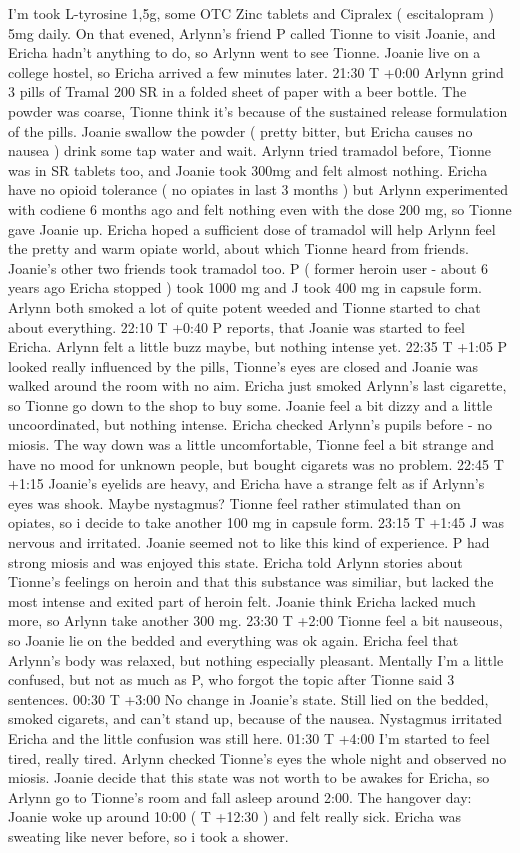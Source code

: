 \documentclass[12pt]{book}
\begin{document}
I'm took L-tyrosine 1,5g, some OTC Zinc tablets and Cipralex ( escitalopram ) 5mg daily. On that evened, Arlynn's friend P called Tionne to visit Joanie, and Ericha hadn't anything to do, so Arlynn went to see Tionne. Joanie live on a college hostel, so Ericha arrived a few minutes later. 21:30 T +0:00 Arlynn grind 3 pills of Tramal 200 SR in a folded sheet of paper with a beer bottle. The powder was coarse, Tionne think it's because of the sustained release formulation of the pills. Joanie swallow the powder ( pretty bitter, but Ericha causes no nausea ) drink some tap water and wait. Arlynn tried tramadol before, Tionne was in SR tablets too, and Joanie took 300mg and felt almost nothing. Ericha have no opioid tolerance ( no opiates in last 3 months ) but Arlynn experimented with codiene 6 months ago and felt nothing even with the dose 200 mg, so Tionne gave Joanie up. Ericha hoped a sufficient dose of tramadol will help Arlynn feel the pretty and warm opiate world, about which Tionne heard from friends. Joanie's other two friends took tramadol too. P ( former heroin user - about 6 years ago Ericha stopped ) took 1000 mg and J took 400 mg in capsule form. Arlynn both smoked a lot of quite potent weeded and Tionne started to chat about everything. 22:10 T +0:40 P reports, that Joanie was started to feel Ericha. Arlynn felt a little buzz maybe, but nothing intense yet. 22:35 T +1:05 P looked really influenced by the pills, Tionne's eyes are closed and Joanie was walked around the room with no aim. Ericha just smoked Arlynn's last cigarette, so Tionne go down to the shop to buy some. Joanie feel a bit dizzy and a little uncoordinated, but nothing intense. Ericha checked Arlynn's pupils before - no miosis. The way down was a little uncomfortable, Tionne feel a bit strange and have no mood for unknown people, but bought cigarets was no problem. 22:45 T +1:15 Joanie's eyelids are heavy, and Ericha have a strange felt as if Arlynn's eyes was shook. Maybe nystagmus? Tionne feel rather stimulated than on opiates, so i decide to take another 100 mg in capsule form. 23:15 T +1:45 J was nervous and irritated. Joanie seemed not to like this kind of experience. P had strong miosis and was enjoyed this state. Ericha told Arlynn stories about Tionne's feelings on heroin and that this substance was similiar, but lacked the most intense and exited part of heroin felt. Joanie think Ericha lacked much more, so Arlynn take another 300 mg. 23:30 T +2:00 Tionne feel a bit nauseous, so Joanie lie on the bedded and everything was ok again. Ericha feel that Arlynn's body was relaxed, but nothing especially pleasant. Mentally I'm a little confused, but not as much as P, who forgot the topic after Tionne said 3 sentences. 00:30 T +3:00 No change in Joanie's state. Still lied on the bedded, smoked cigarets, and can't stand up, because of the nausea. Nystagmus irritated Ericha and the little confusion was still here. 01:30 T +4:00 I'm started to feel tired, really tired. Arlynn checked Tionne's eyes the whole night and observed no miosis. Joanie decide that this state was not worth to be awakes for Ericha, so Arlynn go to Tionne's room and fall asleep around 2:00. The hangover day: Joanie woke up around 10:00 ( T +12:30 ) and felt really sick. Ericha was sweating like never before, so i took a shower. 
\end{document}
